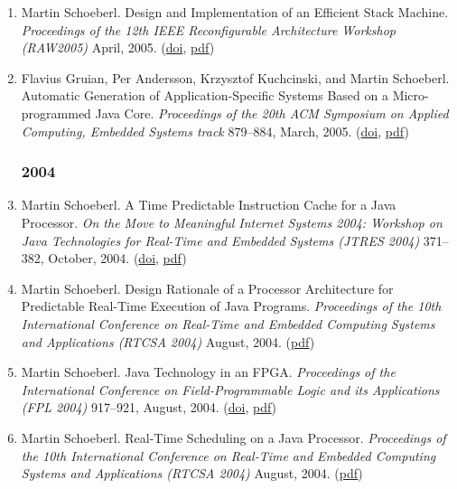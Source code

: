 \begin{enumerate}
\item Martin Schoeberl.
 Design and Implementation of an Efficient Stack Machine.
 \emph{Proceedings of the 12th IEEE Reconfigurable Architecture Workshop (RAW2005)} April, 2005.
(\href{http://dx.doi.org/10.1109/IPDPS.2005.161}{doi}, \href{http://www.jopdesign.com/doc/stack.pdf}{pdf})

\item Flavius Gruian, Per Andersson, Krzysztof Kuchcinski, and Martin Schoeberl.
 Automatic Generation of Application-Specific Systems Based on a Micro-programmed Java Core.
 \emph{Proceedings of the 20th ACM Symposium on Applied Computing, Embedded Systems track} 879--884, March, 2005.
(\href{http://dx.doi.org/10.1145/1066677.1066877}{doi}, \href{http://www.jopdesign.com/doc/sac05.pdf}{pdf})


\subsubsection*{2004}

\item Martin Schoeberl.
 A Time Predictable Instruction Cache for a Java Processor.
 \emph{On the Move to Meaningful Internet Systems 2004: Workshop on {J}ava Technologies for Real-Time and Embedded Systems (JTRES 2004)} 371--382, October, 2004.
(\href{http://dx.doi.org/10.1007/b102133}{doi}, \href{http://www.jopdesign.com/doc/jtres_cache.pdf}{pdf})

\item Martin Schoeberl.
 Design Rationale of a Processor Architecture for Predictable Real-Time Execution of Java Programs.
 \emph{Proceedings of the 10th International Conference on Real-Time and Embedded Computing Systems and Applications (RTCSA 2004)} August, 2004.
(\href{http://www.jopdesign.com/doc/design.pdf}{pdf})

\item Martin Schoeberl.
 Java Technology in an FPGA.
 \emph{Proceedings of the International Conference on Field-Programmable Logic and its Applications (FPL 2004)} 917--921, August, 2004.
(\href{http://dx.doi.org/10.1007/b99787}{doi}, \href{http://www.jopdesign.com/doc/fpl2004.pdf}{pdf})

\item Martin Schoeberl.
 Real-Time Scheduling on a Java Processor.
 \emph{Proceedings of the 10th International Conference on Real-Time and Embedded Computing Systems and Applications (RTCSA 2004)} August, 2004.
(\href{http://www.jopdesign.com/doc/javasched.pdf}{pdf})


\end{enumerate}
